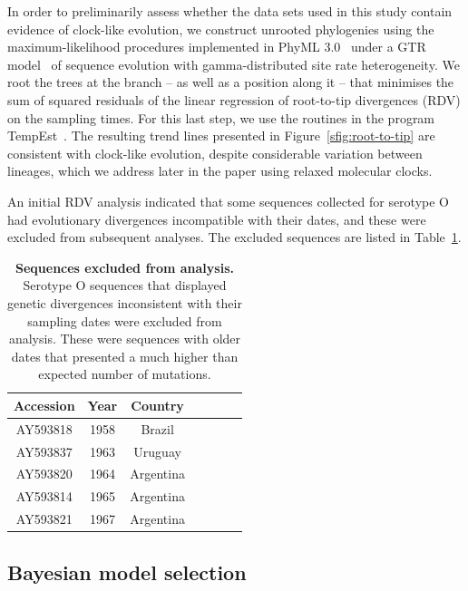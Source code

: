 \documentclass[a4paper,10pt]{article}
\begin{document}
In order to preliminarily assess whether the data sets used in this study contain evidence of clock-like evolution, we construct unrooted phylogenies using the maximum-likelihood procedures implemented in PhyML 3.0~\citep{M-Guindon2003} under a GTR model~\citep{M-Tavare1986} of sequence evolution with gamma-distributed site rate heterogeneity. %
We root the trees at the branch -- as well as a position along it -- that minimises the sum of squared residuals of the linear regression of root-to-tip divergences (RDV) on the sampling times.
For this last step, we use the routines in the program TempEst~\citep{M-Rambaut2016}.
The resulting trend lines presented in Figure~\ref{sfig:root-to-tip} are consistent with clock-like evolution, despite considerable variation between lineages, which we address later in the paper using relaxed molecular clocks.

An initial RDV analysis indicated that some sequences collected for serotype O had evolutionary divergences incompatible with their dates, and these were excluded from subsequent analyses.
The excluded sequences are listed in Table~\ref{stab:exclseqs}.

\begin{table}[H]
\caption{\textbf{Sequences excluded from analysis.}
Serotype O sequences that displayed genetic divergences inconsistent with their sampling dates were excluded from analysis.
These were sequences with older dates that presented a much higher than expected number of mutations.
}
\begin{center}
\begin{tabular}{ccccccc}
\toprule
Accession & Year & Country \\      
\midrule
AY593818 & 1958 & Brazil \\
AY593837 & 1963 & Uruguay \\ 
AY593820 & 1964 & Argentina  \\
AY593814 & 1965 & Argentina \\
AY593821 & 1967 & Argentina \\
\bottomrule
\end{tabular}
\end{center}
\begin{flushleft}
\end{flushleft}
\label{stab:exclseqs}
 \end{table}

 
\subsection*{Bayesian model selection}
\end{document}
